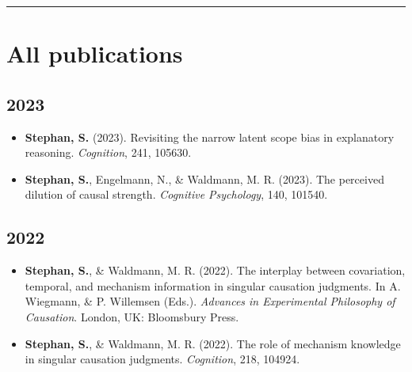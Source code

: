\documentclass[
]{article}
\begin{document}
\begin{center}\rule{0.5\linewidth}{0.5pt}\end{center}

\hfill\break

\hypertarget{all-publications}{%
\section{All publications}\label{all-publications}}

\hypertarget{section-4}{%
\subsection{2023}\label{section-4}}

\begin{itemize}
\item
  \textbf{Stephan, S.} (2023). Revisiting the narrow latent scope bias
  in explanatory reasoning. \emph{Cognition}, 241,
  105630.{\href{publications/Stephan_2023_RevisitingTheNarrowLatentScopeBias.pdf}{}}
  {\href{https://simonstephan31.github.io/revisit_nlsbias/index.html}{}}
  {\href{https://osf.io/n94ed/}{}}{\href{https://psyarxiv.com/a8cve/}{}}
\item
  \textbf{Stephan, S.}, Engelmann, N., \& Waldmann, M. R. (2023). The
  perceived dilution of causal strength. \emph{Cognitive Psychology},
  140,
  101540.{\href{publications/Stephan_Engelmann_Waldmann_2023_strengthDilution.pdf}{}}
  {\href{https://simonstephan31.github.io/The-Dilution-of-Causal-Strength/index.html}{}}
  {\href{https://osf.io/nrv7p/}{}}
\end{itemize}

\hypertarget{section-5}{%
\subsection{2022}\label{section-5}}

\begin{itemize}
\item
  \textbf{Stephan, S.}, \& Waldmann, M. R. (2022). The interplay between
  covariation, temporal, and mechanism information in singular causation
  judgments. In A. Wiegmann, \& P. Willemsen (Eds.). \emph{Advances in
  Experimental Philosophy of Causation}. London, UK: Bloomsbury Press.
  {\href{https://psyarxiv.com/ucafn}{}}
\item
  \textbf{Stephan, S.}, \& Waldmann, M. R. (2022). The role of mechanism
  knowledge in singular causation judgments. \emph{Cognition}, 218,
  104924.
  {\href{publications/Stephan_Waldmann_2021_MechanismCognit.pdf}{}}
  {\href{https://osf.io/325pr/}{}}
  {\href{https://github.com/SimonStephan31/The-Role-of-Mechanism-Information-in-Singular-Causation}{}}
\end{itemize}
\end{document}
